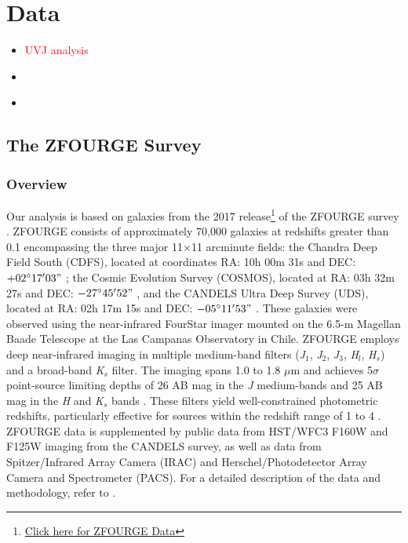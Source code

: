 \chapter{Data}
\thispagestyle{empty}

\begin{itemize}
    \item \textcolor{red}{UVJ analysis}
    \item \textcolor{red}{}
    \item \textcolor{red}{}
\end{itemize}

\section{The ZFOURGE Survey}
\subsection{Overview}
Our analysis is based on galaxies from the 2017 release\footnote{\href{http://vizier.cds.unistra.fr/viz-bin/VizieR?-source=J/ApJ/830/51&-to=2}{Click here for ZFOURGE Data}} of the ZFOURGE survey \citep{straatman_fourstar_2016}. ZFOURGE consists of approximately 70,000 galaxies at redshifts greater than 0.1 encompassing the three major 11$\times$11 arcminute fields: the Chandra Deep Field South (CDFS), located at coordinates RA: 10h 00m 31s and DEC: $+02^\circ 17' 03"$ \citep{giacconi_chandra_2002}; the Cosmic Evolution Survey (COSMOS), located at RA: 03h 32m 27s and DEC: $-27^\circ 45' 52"$ \citep{scoville_cosmic_2007}, and the CANDELS Ultra Deep Survey (UDS), located at RA: 02h 17m 15s and DEC: $-05^\circ 11' 53"$ \citep{lawrence_ukirt_2007}. These galaxies were observed using the near-infrared FourStar imager \citep{persson_fourstar_2013} mounted on the 6.5-m Magellan Baade Telescope at the Las Campanas Observatory in Chile. ZFOURGE employs deep near-infrared imaging in multiple medium-band filters (\textit{J}$_{1}$, \textit{J}$_2$, \textit{J}$_{3}$, \textit{H}$_{l}$, \textit{H}$_{s}$) and a broad-band \textit{K}$_{s}$ filter. The imaging spans 1.0 to 1.8 $\mu$m and achieves 5$\sigma$ point-source limiting depths of 26 AB mag in the \textit{J} medium-bands and 25 AB mag in the \textit{H} and \textit{K}$_{s}$ bands \citep{spitler_first_2012}. These filters yield well-constrained photometric redshifts, particularly effective for sources within the redshift range of 1 to 4 \citep{spitler_first_2012}. ZFOURGE data is supplemented by public data from HST/WFC3 F160W and F125W imaging from the CANDELS survey, as well as data from Spitzer/Infrared Array Camera (IRAC) and Herschel/Photodetector Array Camera and Spectrometer (PACS). For a detailed description of the data and methodology, refer to \cite{straatman_fourstar_2016}.

